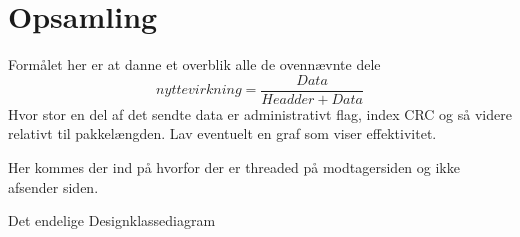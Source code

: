 \section{Opsamling}
Formålet her er at danne et overblik alle de ovennævnte dele
\begin{equation}
nyttevirkning = \frac{Data}{Headder + Data}
\end{equation}
Hvor stor en del af det sendte data er administrativt flag, index CRC og så videre relativt til pakkelængden. Lav eventuelt en graf som viser effektivitet.

Her kommes der ind på hvorfor der er threaded på modtagersiden og ikke afsender siden. 

Det endelige Designklassediagram
